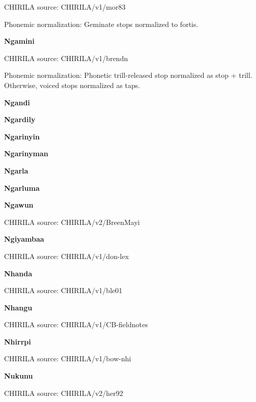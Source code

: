 CHIRILA source: CHIRILA/v1/mor83


Phonemic normalization: Geminate stops normalized to fortis.

\textbf{Ngamini}

CHIRILA source: CHIRILA/v1/brendn


Phonemic normalization: Phonetic trill-released stop normalized as stop
+ trill. Otherwise, voiced stops normalized as taps.

\textbf{Ngandi}


\textbf{Ngardily}


\textbf{Ngarinyin}


\textbf{Ngarinyman}


\textbf{Ngarla}


\textbf{Ngarluma}


\textbf{Ngawun}

CHIRILA source: CHIRILA/v2/BreenMayi


\textbf{Ngiyambaa}

CHIRILA source: CHIRILA/v1/don-lex


\textbf{Nhanda}

CHIRILA source: CHIRILA/v1/ble01


\textbf{Nhangu}

CHIRILA source: CHIRILA/v1/CB-fieldnotes


\textbf{Nhirrpi}

CHIRILA source: CHIRILA/v1/bow-nhi


\textbf{Nukunu}

CHIRILA source: CHIRILA/v2/her92


